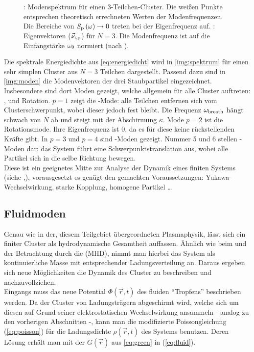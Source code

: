 \begin{figure}
\begin{subfigure}[b]{0.48\textwidth}
              \caption{}
              \label{img:moden}
            \end{subfigure}
            \caption{: Modenspektrum für einen 3-Teilchen-Cluster. Die weißen Punkte entsprechen theoretisch errechneten Werten der Modenfrequenzen. Die Bereiche von $S_\text{p}\left(\omega\right)\rightarrow0$ treten bei der Eigenfrequenz auf. : Eigenvektoren ($\vec{\nu}_\text{i,p}$) für $N=3$. Die Modenfrequenz ist auf die Einfangstärke $\omega_\text{0}$ normiert (nach \cite{Melzer12}).}
          \end{figure}

        Die spektrale Energiedichte aus \autoref{eq:energiedicht} wird in \autoref{img:spektrum} für einen sehr simplen Cluster aus $N=3$ Teilchen dargestellt. Passend dazu sind in \autoref{img:moden} die Modenvektoren der drei Staubpartikel eingezeichnet. Insbesondere sind dort Moden gezeigt, welche allgemein für alle Cluster auftreten: ,  und Rotation. $p=1$ zeigt die -Mode: alle Teilchen entfernen sich vom Clusterschwerpunkt, wobei dieser jedoch fest bleibt. Die Frequenz $\omega_\text{breath}$ hängt schwach von $N$ ab und steigt mit der Abschirmung $\kappa$. Mode $p=2$ ist die Rotationsmode. Ihre Eigenfrequenz ist $0$, da es für diese keine rückstellenden Kräfte gibt. In $p=3$ und $p=4$ sind -Moden gezeigt. Nummer 5 und 6 stellen -Moden dar: das System führt eine Schwerpunktstranslation aus, wobei alle Partikel sich in die selbe Richtung bewegen.\\
        Diese  ist ein geeignetes Mitte zur Analyse der Dynamik eines finiten Systems (siehe \cite{Melzer01},\cite{Melzer03}), vorausgesetzt es genügt den gemachten Voraussetzungen: Yukawa-Wechselwirkung, starke Kopplung, homogene Partikel \dots

      \subsection*{Fluidmoden}

        Genau wie in der, diesem Teilgebiet übergeordneten Plasmaphysik, lässt sich ein finiter Cluster als hydrodynamische Gesamtheit auffassen. Ähnlich wie beim  und der Betrachtung durch die  (MHD), nimmt man hierbei das System als kontinuierliche Masse mit entsprechender Ladungsverteilung an. Daraus ergeben sich neue Möglichkeiten die Dynamik des Cluster zu beschreiben und nachzuvollziehen.\\
        Eingangs muss das neue Potential $\Phi\left(\vec{r},t\right)$ des fluiden "`Tropfens"' beschrieben werden. Da der Cluster von Ladungsträgern abgeschirmt wird, welche sich um diesen auf Grund seiner elektrostatischen Wechselwirkung ansammeln - analog zu den vorherigen Abschnitten -, kann man die modifizierte Poissongleichung (\autoref{eq:poisson}) für die Ladungsdichte $\rho\left(\vec{r},t\right)$ des Systems benutzen. Deren Lösung erhält man mit der  $G\left(\vec{r}\right)$ aus \autoref{eq:green} in (\ref{eq:fluid}). 


